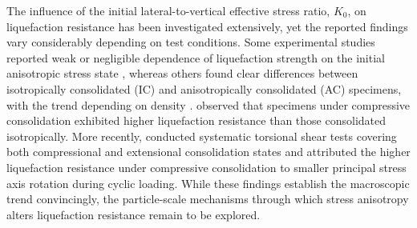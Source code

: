 \documentclass[a4paper,fleqn]{cas-sc}
\newcommand{\Kzero}{\ensuremath{K_0}}
\begin{document}
The influence of the initial lateral-to-vertical effective stress ratio, \Kzero{}, on liquefaction resistance has been investigated extensively, yet the reported findings vary considerably depending on test conditions. Some experimental studies reported weak or negligible dependence of liquefaction strength on the initial anisotropic stress state \citep[e.g.,][]{IshiharaTakatsu1979,YamashitaToki1993}, whereas others found clear differences between isotropically consolidated (IC) and anisotropically consolidated (AC) specimens, with the trend depending on density \citep{GeorgiannouKonstadinou2014}. \citet{Vargas2020} observed that specimens under compressive consolidation exhibited higher liquefaction resistance than those consolidated isotropically. More recently, \citet{Zhao2024} conducted systematic torsional shear tests covering both compressional and extensional consolidation states and attributed the higher liquefaction resistance under compressive consolidation to smaller principal stress axis rotation during cyclic loading. While these findings establish the macroscopic trend convincingly, the particle-scale mechanisms through which stress anisotropy alters liquefaction resistance remain to be explored.
\end{document}
